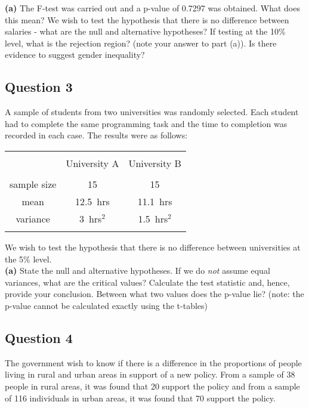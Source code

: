 \documentclass[a4paper,12pt]{article}
\begin{document}
{\bf(a)} The F-test was carried out and a p-value of 0.7297 was obtained. What does this mean?  We wish to test the hypothesis that there is no difference between salaries - what are the null and alternative hypotheses?  If testing at the 10\% level, what is the rejection region? (note your answer to part (a)).  Is there evidence to suggest gender inequality?



\subsection*{Question 3}
A sample of students from two universities was randomly selected. Each student had to complete the same programming task and the time to completion was recorded in each case. The results were as follows: \\[-0.2cm]

\begin{center}
\begin{tabular}{|c|c|c|}
\hline
&&\\[-0.4cm]
& University A & University B \\
\hline
&&\\[-0.4cm]
sample size & 15 & 15 \\
mean & 12.5\,\,\,hrs & 11.1\,\,\,hrs \\
variance & 3\,\,\,hrs$^2$ & 1.5\,\,\,hrs$^2$ \\
\hline
\multicolumn{3}{c}{}\\[-0.3cm]
\end{tabular}
\end{center}

We wish to test the hypothesis that there is no difference between universities at the 5\% level.\\[0.2cm]
{\bf(a)} State the null and alternative hypotheses.  If we do \emph{not} assume equal variances, what are the critical values?  Calculate the test statistic and, hence, provide your conclusion.  Between what two values does the p-value lie? (note: the p-value cannot be calculated exactly using the t-tables)



\subsection*{Question 4}
The government wish to know if there is a difference in the proportions of people living in rural and urban areas in support of a new policy. From a sample of 38 people in rural areas, it was found that 20 support the policy and from a sample of 116 individuals in urban areas, it was found that 70 support the policy. \\[-0.2cm]
\end{document}

